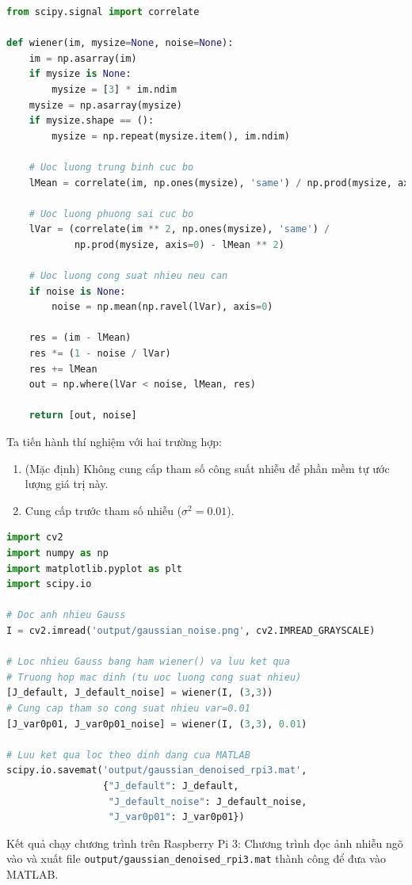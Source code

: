 \begin{lstlisting}[language=Python]
from scipy.signal import correlate

def wiener(im, mysize=None, noise=None):
    im = np.asarray(im)
    if mysize is None:
        mysize = [3] * im.ndim
    mysize = np.asarray(mysize)
    if mysize.shape == ():
        mysize = np.repeat(mysize.item(), im.ndim)

    # Uoc luong trung binh cuc bo
    lMean = correlate(im, np.ones(mysize), 'same') / np.prod(mysize, axis=0)

    # Uoc luong phuong sai cuc bo
    lVar = (correlate(im ** 2, np.ones(mysize), 'same') /
            np.prod(mysize, axis=0) - lMean ** 2)

    # Uoc luong cong suat nhieu neu can
    if noise is None:
        noise = np.mean(np.ravel(lVar), axis=0)

    res = (im - lMean)
    res *= (1 - noise / lVar)
    res += lMean
    out = np.where(lVar < noise, lMean, res)

    return [out, noise]
\end{lstlisting}


Ta tiến hành thí nghiệm với hai trường hợp:
\begin{enumerate}
    \item (Mặc định) Không cung cấp tham số công suất nhiễu để phần mềm tự ước lượng giá trị này.
    \item Cung cấp trước tham số nhiễu ($\sigma^2 = 0.01$).
\end{enumerate}

\begin{lstlisting}[language=Python]
import cv2
import numpy as np
import matplotlib.pyplot as plt
import scipy.io

# Doc anh nhieu Gauss
I = cv2.imread('output/gaussian_noise.png', cv2.IMREAD_GRAYSCALE)

# Loc nhieu Gauss bang ham wiener() va luu ket qua
# Truong hop mac dinh (tu uoc luong cong suat nhieu)
[J_default, J_default_noise] = wiener(I, (3,3))
# Cung cap tham so cong suat nhieu var=0.01
[J_var0p01, J_var0p01_noise] = wiener(I, (3,3), 0.01)

# Luu ket qua loc theo dinh dang cua MATLAB
scipy.io.savemat('output/gaussian_denoised_rpi3.mat', 
                 {"J_default": J_default, 
                  "J_default_noise": J_default_noise,
                  "J_var0p01": J_var0p01})
\end{lstlisting}

Kết quả chạy chương trình trên Raspberry Pi 3: 
Chương trình đọc ảnh nhiễu ngõ vào và xuất file \verb|output/gaussian_denoised_rpi3.mat| thành công để đưa vào MATLAB.

